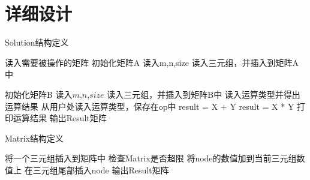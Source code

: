 \newpage

\section{详细设计}
\begin{algorithm}[htb] 
   \caption{ Solution结构定义 } 
   \label{alg:Framwork} 
   \begin{algorithmic}[1]
      \State 读入需要被操作的矩阵
         \State 初始化矩阵A
         \State 读入m,n,size
            \State 读入三元组，并插入到矩阵A中
         \EndFor

         \State 初始化矩阵B
         \State 读入$m$,$n$,$size$
            \State 读入三元组，并插入到矩阵B中
         \EndFor
      \EndFunction
      \State 读入运算类型并得出运算结果
         \State 从用户处读入运算类型，保存在op中
            \State   result = X + Y
         \Else
            \State   result = X * Y
         \EndIf
      \EndFunction
      \State 打印运算结果
         \State 输出Result矩阵
      \EndFunction

   \end{algorithmic} 
\end{algorithm}

\newpage

\begin{algorithm}[htb] 
   \caption{ Matrix结构定义 } 
   \label{alg:Framwork} 
   \begin{algorithmic}[1]
      \State 将一个三元组插入到矩阵中
         \State 检查Matrix是否超限
               \State 将node的数值加到当前三元组数值上
            \EndIf
         \EndFor
            \State 在三元组尾部插入node
         \EndIf
      \EndFunction
         \State 输出Result矩阵
      \EndFunction

   \end{algorithmic} 
\end{algorithm}

\newpage


